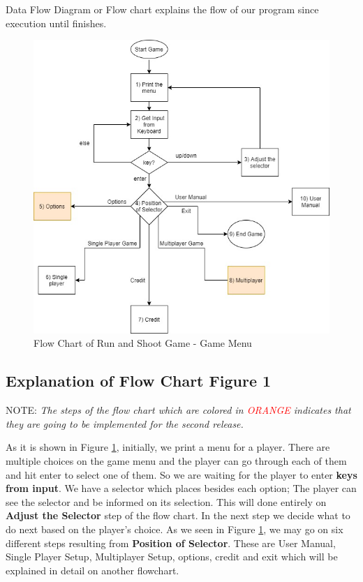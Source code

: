 Data Flow Diagram or Flow chart explains the flow of our program since execution until finishes. 
\begin{figure}[ht] 
       
        \centering \includegraphics[width=0.8\columnwidth]{Run_and_shoot-Page-1}
        \caption{
        Flow Chart of Run and Shoot Game - Game Menu}
        \label{fig:menu}
\end{figure}

\subsection{Explanation of Flow Chart Figure 1}
NOTE:\emph{ The steps of the flow chart which are colored in  \textcolor{red}{ORANGE} indicates that they are going to be implemented for the second release.}

\vspace{0.5\baselineskip} %

As it is shown in Figure \ref{fig:menu}, initially, we print a menu for a player. There are multiple choices on the game menu and the player can go through each of them and hit enter to select one of them. So we are waiting for the player to enter \textbf{keys from input}.
We have a selector which places besides each option; The player can see the selector and be informed on its selection. This will done entirely on \textbf{Adjust the Selector} step of the flow chart.
In the next step we decide what to do next based on the player's choice. As we seen in Figure \ref{fig:menu}, we may go on six different steps resulting from \textbf{Position of Selector}. These are User Manual, Single Player Setup, Multiplayer Setup, options, credit and exit which will be explained in detail on another flowchart.






